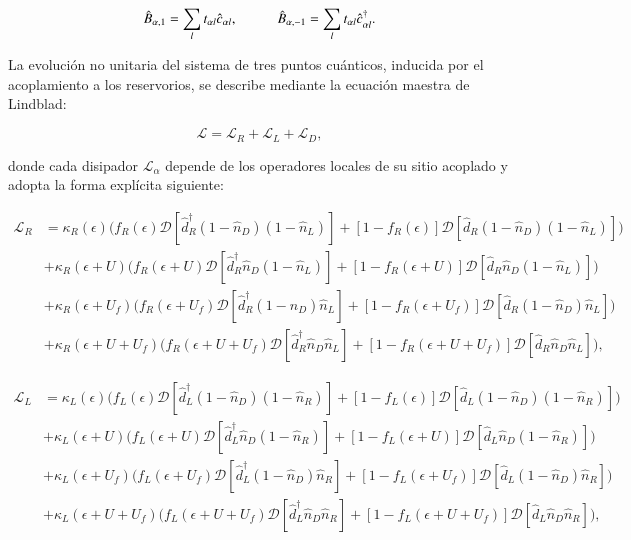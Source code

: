 \begin{equation*}
    \hat{B}_{\alpha,1} = \sum_{l}t_{\alpha l} \hat{c}_{\alpha l}, \hspace{10mm} \hat{B}_{\alpha,-1} = \sum_{l}t_{\alpha l} \hat{c}^{\dagger}_{\alpha l}.
\end{equation*}

La evolución no unitaria del sistema de tres puntos cuánticos, inducida por el acoplamiento a los reservorios, se describe mediante la ecuación maestra de Lindblad:  

\begin{equation}
    \mathcal{L} = \mathcal{L}_{R} + \mathcal{L}_{L} + \mathcal{L}_{D},
    \label{Lindbladsec5}
\end{equation}

donde cada disipador $\mathcal{L}_\alpha$ depende de los operadores locales de su sitio acoplado y adopta la forma explícita siguiente:

\begin{align*}
\mathcal{L}_R &= \kappa_R(\epsilon)\big( f_R(\epsilon)\mathcal{D}[\hat{d}^\dagger_R(1-\hat{n}_D)(1-\hat{n}_L)] + [1-f_R(\epsilon)]\mathcal{D}[\hat{d}_R(1-\hat{n}_D)(1-\hat{n}_L)] \big) \\
&+ \kappa_R(\epsilon+U)\big( f_R(\epsilon+U)\mathcal{D}[\hat{d}^\dagger_R\hat{n}_D(1-\hat{n}_L)] + [1-f_R(\epsilon+U)]\mathcal{D}[\hat{d}_R\hat{n}_D(1-\hat{n}_L)] \big) \\
&+ \kappa_R(\epsilon+U_f)\big( f_R(\epsilon+U_f)\mathcal{D}[\hat{d}^\dagger_R(1-\hat{n}_D)\hat{n}_L] + [1-f_R(\epsilon+U_f)]\mathcal{D}[\hat{d}_R(1-\hat{n}_D)\hat{n}_L] \big) \\
&+ \kappa_R(\epsilon+U+U_f)\big( f_R(\epsilon+U+U_f)\mathcal{D}[\hat{d}^\dagger_R\hat{n}_D\hat{n}_L] + [1-f_R(\epsilon+U+U_f)]\mathcal{D}[\hat{d}_R\hat{n}_D\hat{n}_L] \big),
\end{align*}

\begin{align*}
\mathcal{L}_L &= \kappa_L(\epsilon)\big( f_L(\epsilon)\mathcal{D}[\hat{d}^\dagger_L(1-\hat{n}_D)(1-\hat{n}_R)] + [1-f_L(\epsilon)]\mathcal{D}[\hat{d}_L(1-\hat{n}_D)(1-\hat{n}_R)] \big) \\
&+ \kappa_L(\epsilon+U)\big( f_L(\epsilon+U)\mathcal{D}[\hat{d}^\dagger_L\hat{n}_D(1-\hat{n}_R)] + [1-f_L(\epsilon+U)]\mathcal{D}[\hat{d}_L\hat{n}_D(1-\hat{n}_R)] \big) \\
&+ \kappa_L(\epsilon+U_f)\big( f_L(\epsilon+U_f)\mathcal{D}[\hat{d}^\dagger_L(1-\hat{n}_D)\hat{n}_R] + [1-f_L(\epsilon+U_f)]\mathcal{D}[\hat{d}_L(1-\hat{n}_D)\hat{n}_R] \big) \\
&+ \kappa_L(\epsilon+U+U_f)\big( f_L(\epsilon+U+U_f)\mathcal{D}[\hat{d}^\dagger_L\hat{n}_D\hat{n}_R] + [1-f_L(\epsilon+U+U_f)]\mathcal{D}[\hat{d}_L\hat{n}_D\hat{n}_R] \big),
\end{align*}

